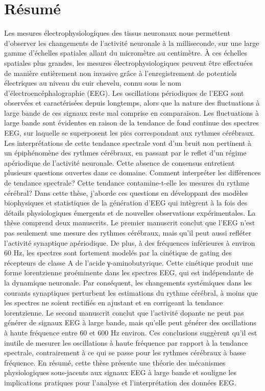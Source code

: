 \documentclass[11pt]{report}
\begin{document}
\newpage

\chapter*{Résumé}
Les mesures électrophysiologiques des tissus neuronaux nous permettent d'observer les changements de l'activité neuronale à la milliseconde, sur une large gamme d'échelles spatiales allant du micromètre au centimètre. À ces échelles spatiales plus grandes, les mesures électrophysiologiques peuvent être effectuées de manière entièrement non invasive grâce à l'enregistrement de potentiels électriques au niveau du cuir chevelu, connu sous le nom d'électroencéphalographie (EEG). Les oscillations périodiques de l'EEG sont observées et caractérisées depuis longtemps, alors que la nature des fluctuations à large bande de ces signaux reste mal comprise en comparaison. Les fluctuations à large bande sont évidentes en raison de la tendance de fond continue des spectres EEG, sur laquelle se superposent les pics correspondant aux rythmes cérébraux. Les interprétations de cette tendance spectrale vont d'un bruit non pertinent à un épiphénomène des rythmes cérébraux, en passant par le reflet d'un régime apériodique de l'activité neuronale. Cette absence de consensus entretient plusieurs questions ouvertes dans ce domaine. Comment interpréter les différences de tendance spectrale? Cette tendance contamine-t-elle les mesures du rythme cérébral? Dans cette thèse, j'aborde ces questions en développant des modèles biophysiques et statistiques de la génération d'EEG qui intègrent à la fois des détails physiologiques émergents et de nouvelles observations expérimentales. La thèse comprend deux manuscrits. Le premier manuscrit conclut que l'EEG n'est pas seulement une mesure des rythmes cérébraux, mais qu'il peut aussi refléter l'activité synaptique apériodique. De plus, à des fréquences inférieures à environ 60 Hz, les spectres sont fortement modelés par la cinétique de gating des récepteurs de classe A de l'acide γ-aminobutyrique. Cette cinétique produit une forme lorentzienne proéminente dans les spectres EEG, qui est indépendante de la dynamique neuronale. Par conséquent, les changements systémiques dans les courants synaptiques perturbent les estimations du rythme cérébral, à moins que les spectres ne soient rectifiés en ajustant et en corrigeant la tendance lorentzienne. Le second manuscrit conclut que l'activité dopante ne peut pas générer de signaux EEG à large bande, mais qu'elle peut générer des oscillations à haute fréquence entre 60 et 600 Hz environ. Ces conclusions suggèrent qu'il est inutile de mesurer les oscillations à haute fréquence par rapport à la tendance spectrale, contrairement à ce qui se passe pour les rythmes cérébraux à basse fréquence. En résumé, cette thèse présente une théorie des mécanismes physiologiques sous-jacents aux signaux EEG à large bande et souligne les implications pratiques pour l'analyse et l'interprétation des données EEG.
\end{document}
